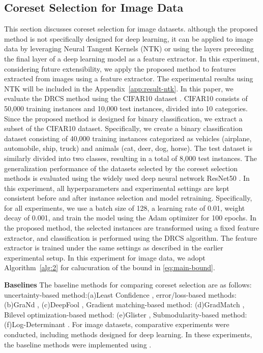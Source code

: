 \subsection{Coreset Selection for Image Data}
	\label{subsec:result-image}
	This section discusses coreset selection for image datasets.  although the proposed method is not specifically designed for deep learning, it can be applied to image data by leveraging Neural Tangent Kernels (NTK)\citep{neuraltangents2020} or using the layers preceding the final layer of a deep learning model as a feature extractor.
	In this experiment, considering future extensibility, we apply the proposed method to features extracted from images using a feature extractor.
	The experimental results using NTK will be included in the Appendix~\ref{app:result-ntk}.
	In this paper, we evaluate the DRCS method using the CIFAR10 dataset \citep{cifar10}.  
	CIFAR10 consists of 50,000 training instances and 10,000 test instances, divided into 10 categories.  
	Since the proposed method is designed for binary classification, we extract a subset of the CIFAR10 dataset.  
	Specifically, we create a binary classification dataset consisting of 40,000 training instances categorized as vehicles (airplane, automobile, ship, truck) and animals (cat, deer, dog, horse).  
	The test dataset is similarly divided into two classes, resulting in a total of 8,000 test instances.  
	The generalization performance of the datasets selected by the coreset selection methods is evaluated using the widely used deep neural network ResNet50 \citep{he2016deep}.  
	In this experiment, all hyperparameters and experimental settings are kept consistent before and after instance selection and model retraining.  
	Specifically, for all experiments, we use a batch size of 128, a learning rate of 0.01, weight decay of 0.001, and train the model using the Adam optimizer for 100 epochs.  
	In the proposed method, the selected instances are transformed using a fixed feature extractor, and classification is performed using the DRCS algorithm.  
	The feature extractor is trained under the same settings as described in the earlier experimental setup.
	In this experiment for image data, we adopt Algorithm~\ref{alg:2} for calucuration of the bound in \eqref{eq:main-bound}.
	
	{\bf Baselines} The baseline methods for comparing coreset selection are as follows:
	uncertainty-based method:(a)Least Confidence \citep{coleman2019selection}, error/loss-based methods: (b)GraNd \citep{paul2021deep}, (c)DeepFool \citep{ducoffe2018adversarial}, Gradient matching-based method: (d)GradMatch \citep{killamsetty2021grad}, Bilevel optimization-based method: (e)Glister \citep{killamsetty2021glister}, Submodularity-based method: (f)Log-Determinant \citep{iyer2021submodular}.
	For image datasets, comparative experiments were conducted, including methods designed for deep learning.
	In these experiments, the baseline methods were implemented using \citet{guo2022deepcore}.


